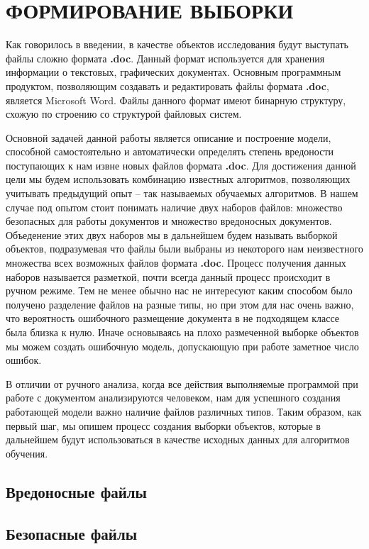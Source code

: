 \chapter{ФОРМИРОВАНИЕ ВЫБОРКИ}

Как говорилось в введении, в качестве объектов исследования будут выступать файлы сложно формата \textbf{.doc}.
Данный формат используется для хранения информации о текстовых, графических документах.
Основным программным продуктом, позволяющим создавать и редактировать файлы формата \textbf{.doc}, является Microsoft Word.
Файлы данного формат имеют бинарную структуру, схожую по строению со структурой файловых систем. \cite{doc_format}

Основной задачей данной работы является описание и построение модели, способной самостоятельно и автоматически определять степень вредоности поступающих к нам извне новых файлов формата \textbf{.doc}.
Для достижения данной цели мы будем использовать комбинацию известных алгоритмов, позволяющих учитывать предыдущий опыт -- так называемых обучаемых алгоритмов.
В нашем случае под опытом стоит понимать наличие двух наборов файлов: множество безопасных для работы документов и множество вредоносных документов.
Объеденение этих двух наборов мы в дальнейшем будем называть выборкой объектов, подразумевая что файлы были выбраны из некоторого нам неизвестного множества всех возможных файлов формата \textbf{.doc}. 
Процесс получения данных наборов называется разметкой, почти всегда данный процесс происходит в ручном режиме.
Тем не менее обычно нас не интересуют каким способом было получено разделение файлов на разные типы, но при этом для нас очень важно, что вероятность ошибочного размещение документа в не подходящем классе была близка к нулю.
Иначе основываясь на плохо размеченной выборке объектов мы можем создать ошибочную модель, допускающую при работе заметное число ошибок.

В отличии от ручного анализа, когда все действия выполняемые программой при работе с документом анализируются человеком, нам для успешного создания работающей модели важно наличие файлов различных типов.
Таким образом, как первый шаг, мы опишем процесс создания выборки объектов, которые в дальнейшем будут использоваться в качестве исходных данных для алгоритмов обучения.

\section{Вредоносные файлы}

\section{Безопасные файлы}